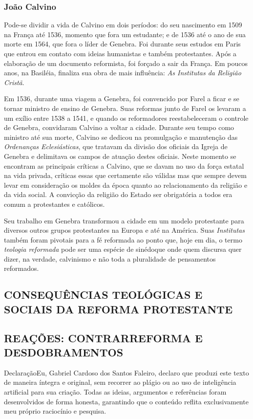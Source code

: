 \documentclass[
    article,            %
	12pt,				%
	oneside,			%
	a4paper,			%
	chapter=TITLE,		%
	section=TITLE,		%
	english,			%
	french,				%
	spanish,			%
	brazil				%
	]{abntex2}
\begin{document}
\subsubsection{João Calvino}
Pode-se dividir a vida de Calvino em dois períodos: do seu nascimento em 1509 na França até 1536, momento que fora um estudante; e de 1536 até o ano de sua morte em 1564, que fora o líder de Genebra. Foi durante seus estudos em Paris que entrou em contato com ideias humanistas e também protestantes. Após a elaboração de um documento reformista, foi forçado a sair da França. Em poucos anos, na Basiléia, finaliza sua obra de mais influência: \emph{As Institutas da Religião Cristã}.

Em 1536, durante uma viagem a Genebra, foi convencido por Farel a ficar e se tornar ministro de ensino de Genebra. Suas reformas junto de Farel os levaram a um exílio entre 1538 a 1541, e quando os reformadores reestabeleceram o controle de Genebra, convidaram Calvino a voltar a cidade. Durante seu tempo como ministro até sua morte, Calvino se dedicou na promulgação e manutenção das \emph{Ordenanças Eclesiásticas}, que tratavam da divisão dos oficiais da Igreja de Genebra e delimitava os campos de atuação destes oficiais. Neste momento se encontram as principais críticas a Calvino, que se davam no uso da força estatal na vida privada, críticas essas que certamente são válidas mas que sempre devem levar em consideração os moldes da época quanto ao relacionamento da religião e da vida social. A convicção da religião do Estado ser obrigatória a todos era comum a protestantes e católicos. 

Seu trabalho em Genebra transformou a cidade em um modelo protestante para diversos outros grupos protestantes na Europa e até na América. Suas \emph{Institutas} também foram pivotais para a fé reformada ao ponto que, hoje em dia, o termo \emph{teologia reformada} pode ser uma espécie de sinédoque onde quem discursa quer dizer, na verdade, calvinismo e não toda a pluralidade de pensamentos reformados. 

\subsection{CONSEQUÊNCIAS TEOLÓGICAS E SOCIAIS DA REFORMA PROTESTANTE}
\subsection{REAÇÕES: CONTRARREFORMA E DESDOBRAMENTOS}


\noindent Declaração\linebreak Eu, Gabriel Cardoso dos Santos Faleiro, declaro que produzi este texto de maneira íntegra e original, sem recorrer ao plágio ou ao uso de inteligência artificial para sua criação. Todas as ideias, argumentos e referências foram desenvolvidos de forma honesta, garantindo que o conteúdo reflita exclusivamente meu próprio raciocínio e pesquisa.

\pagebreak
\renewcommand{\bibname}{{REFER\^ENCIAS}}


\end{document}
